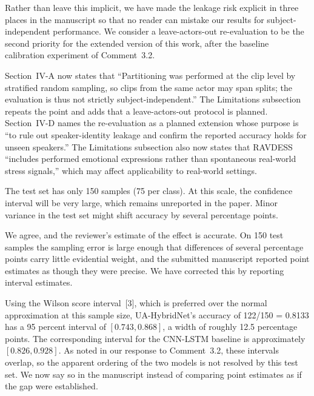 Rather than leave this implicit, we have made the leakage risk explicit
in three places in the manuscript so that no reader can mistake our
results for subject-independent performance. We consider a leave-actors-out
re-evaluation to be the second priority for the extended version of this
work, after the baseline calibration experiment of Comment~3.2.

\begin{changesblock}
Section~IV-A now states that ``Partitioning was performed at the
clip level by stratified random sampling, so clips from the same actor
may span splits; the evaluation is thus not strictly subject-independent.''
The Limitations subsection repeats the point and adds that a
leave-actors-out protocol is planned. Section~IV-D names the
re-evaluation as a planned extension whose purpose is ``to rule out
speaker-identity leakage and confirm the reported accuracy holds for
unseen speakers.'' The Limitations subsection also now states that
RAVDESS ``includes performed emotional expressions rather than
spontaneous real-world stress signals,'' which may affect applicability
to real-world settings.
\end{changesblock}


\begin{reviewercomment}
The test set has only 150 samples (75 per class). At this scale, the
confidence interval will be very large, which remains unreported in the
paper. Minor variance in the test set might shift accuracy by several
percentage points.
\end{reviewercomment}

\response We agree, and the reviewer's estimate of the effect is
accurate. On 150 test samples the sampling error is large enough that
differences of several percentage points carry little evidential weight,
and the submitted manuscript reported point estimates as though they were
precise. We have corrected this by reporting interval estimates.

Using the Wilson score interval~[3], which is preferred over
the normal approximation at this sample size, UA-HybridNet's accuracy of
122/150 = 0.8133 has a 95 percent interval of $[0.743, 0.868]$, a width
of roughly 12.5 percentage points. The corresponding interval for the
CNN-LSTM baseline is approximately $[0.826, 0.928]$. As noted in our
response to Comment~3.2, these intervals overlap, so the apparent
ordering of the two models is not resolved by this test set. We now say
so in the manuscript instead of comparing point estimates as if the gap
were established.

